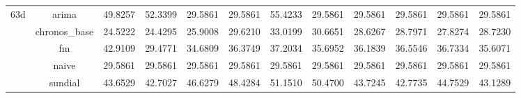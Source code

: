 \begin{table}[H]
{\begin{tabular}{cccccccccccc}
\multirow[c]{5}{*}{63d} & arima & 49.8257 & 52.3399 & 29.5861 & 29.5861 & 55.4233 & 29.5861 & 29.5861 & 29.5861 & 29.5861 & 29.5861 \\
 & chronos_base & 24.5222 & 24.4295 & 25.9008 & 29.6210 & 33.0199 & 30.6651 & 28.6267 & 28.7971 & 27.8274 & 28.7230 \\
 & fm & 42.9109 & 29.4771 & 34.6809 & 36.3749 & 37.2034 & 35.6952 & 36.1839 & 36.5546 & 36.7334 & 35.6071 \\
 & naive & 29.5861 & 29.5861 & 29.5861 & 29.5861 & 29.5861 & 29.5861 & 29.5861 & 29.5861 & 29.5861 & 29.5861 \\
 & sundial & 43.6529 & 42.7027 & 46.6279 & 48.4284 & 51.1510 & 50.4700 & 43.7245 & 42.7735 & 44.7529 & 43.1289 \\
\bottomrule
\end{tabular}

 }
\end{table}